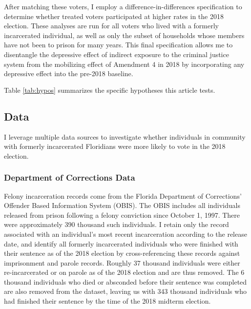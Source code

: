 \documentclass[
  12pt,
]{article}
\begin{document}
After matching these voters, I employ a difference-in-differences specification to determine whether treated voters participated at higher rates in the 2018 election. These analyses are run for all voters who lived with a formerly incarcerated individual, as well as only the subset of households whose members have not been to prison for many years. This final specification allows me to disentangle the depressive effect of indirect exposure to the criminal justice system from the mobilizing effect of Amendment 4 in 2018 by incorporating any depressive effect into the pre-2018 baseline.

Table \ref{tab:hypos} summarizes the specific hypotheses this article tests.



\hypertarget{data}{%
\subsection*{Data}\label{data}}

I leverage multiple data sources to investigate whether individuals in community with formerly incarcerated Floridians were more likely to vote in the 2018 election.

\hypertarget{department-of-corrections-data}{%
\subsubsection*{Department of Corrections Data}\label{department-of-corrections-data}}

Felony incarceration records come from the Florida Department of Corrections' Offender Based Information System (OBIS). The OBIS includes all individuals released from prison following a felony conviction since October 1, 1997. There were approximately 390 thousand such individuals. I retain only the record associated with an individual's most recent incarceration according to the release date, and identify all formerly incarcerated individuals who were finished with their sentence as of the 2018 election by cross-referencing these records against imprisonment and parole records. Roughly 37 thousand individuals were either re-incarcerated or on parole as of the 2018 election and are thus removed. The 6 thousand individuals who died or absconded before their sentence was completed are also removed from the dataset, leaving us with 343 thousand individuals who had finished their sentence by the time of the 2018 midterm election.
\end{document}
